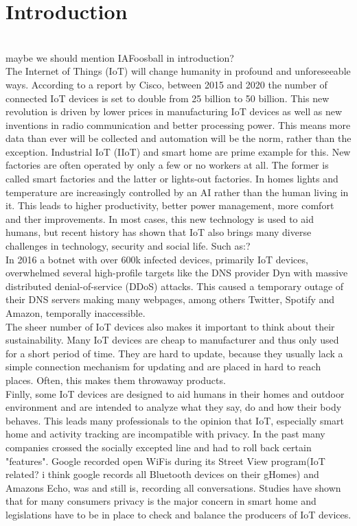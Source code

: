 \section{Introduction}
\\
maybe we should mention IAFoosball in introduction?
\\
The Internet of Things (IoT) will change humanity in profound and unforeseeable ways\cite{ciscoReport}. According to a report by Cisco, between 2015 and 2020 the number of connected IoT devices is set to double from 25 billion to 50 billion\cite{ciscoReport}. This new revolution is driven by lower prices in manufacturing IoT devices as well as new inventions in radio communication and better processing power. This means more data than ever will be collected and automation will be the norm, rather than the exception. Industrial IoT (IIoT) and smart home are prime example for this. New factories are often operated by only a few or no workers at all. The former is called smart factories and the latter or lights-out factories\cite{smartVSLightoutFactories:online}. In homes lights and temperature are increasingly controlled by an AI rather than the human living in it. This leads to higher productivity, better power management, more comfort and ther improvements. In most cases, this new technology is used to aid humans, but recent history has shown that IoT also brings many diverse challenges in technology, security and social life. Such as:?\\

In 2016 a botnet with over 600k infected devices, primarily IoT devices, overwhelmed several high-profile targets like the DNS provider Dyn with massive distributed denial-of-service (DDoS) attacks. This caused a temporary outage of their DNS servers making many webpages, among others  Twitter, Spotify and Amazon, temporally inaccessible.\\

The sheer number of IoT devices also makes it important to think about their sustainability. Many IoT devices are cheap to manufacturer and thus only used for a short period of time. They are hard to update, because they usually lack a simple connection mechanism for updating and are placed in hard to reach places. Often, this makes them throwaway products.\\

Finlly, some IoT devices are designed to aid humans in their homes and outdoor environment and are intended to analyze what they say, do and how their body behaves. This leads many professionals to the opinion that IoT, especially smart home and activity tracking are incompatible with privacy\cite{5Reasons41:online}. In the past many companies crossed the socially excepted line and had to roll back certain "features"\cite{PrivacyIoT50:online}. Google recorded open WiFis during its Street View program(IoT related? i think google records all Bluetooth devices on their gHomes) and Amazons Echo, was and still is, recording all conversations. Studies have shown that for many consumers privacy is the major concern in smart home\cite{PrivacyIoT50:online} and legislations have to be in place to check and balance the producers of IoT devices.\\

